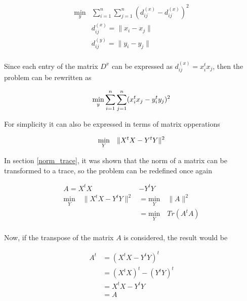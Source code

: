 \documentclass[12pt,journal]{IEEEtran}
\begin{document}
    \begin{equation*}
        \begin{aligned}
            \underset{y}{\text{min}}  & \sum_{i=1}^n \sum_{j=1}^n ( d^{(x)}_{ij} - d^{(x)}_{ij} )^2 \\
            & d_{ij}^{(x)} = \lVert x_i - x_j \rVert\\
            & d_{ij}^{(y)} = \lVert y_i - y_j \rVert
        \end{aligned}
    \end{equation*}\\

    Since each entry of the matrix $D^x$ can be expressed as
    $d_{ij}^{(x)} = x_i^t x_j$, then the problem can be rewritten as

    \begin{equation*}
        \underset{y}{\text{min}} \sum_{i=1}^n \sum_{j=1}^n ( x_i^t x_j - y_i^t y_j )^2 \\
    \end{equation*}

    For simplicity it can also be expressed in terms of matrix opperations

    \begin{equation*}
        \underset{Y}{\text{min}} \quad \lVert X^t X - Y^t Y \rVert^2 \\
    \end{equation*}

    In section \ref{norm_trace}, it was shown that the norm of a matrix can be
    transformed to a trace, so the problem can be redefined once again

    \begin{equation*}
        \begin{aligned}
            A = X^tX &- Y^tY\\
            \underset{Y}{\text{min}} \quad \lVert X^t X - Y^t Y \rVert^2
            &=
            \underset{Y}{\text{min}} \quad \lVert A \rVert^2\\
            &=
            \underset{Y}{\text{min}} \quad Tr(A^tA) \\
        \end{aligned}
    \end{equation*}

    Now, if the transpose of the matrix $A$ is considered, the result would be

    \begin{equation*}
        \begin{aligned}
            A^t &= (X^tX - Y^tY)^t\\
                &= (X^tX)^t - (Y^tY)^t\\
                &= X^tX - Y^tY\\
                &= A
        \end{aligned}
    \end{equation*}
\end{document}
